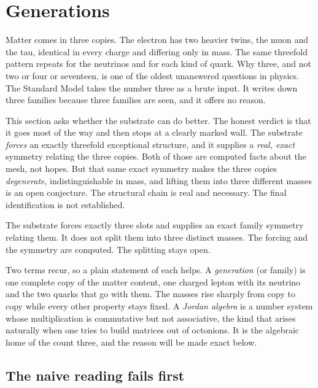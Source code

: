 \section{Generations}

Matter comes in three copies. The electron has two heavier twins, the muon and the tau, identical in every charge and differing only in mass. The same threefold pattern repeats for the neutrinos and for each kind of quark. Why three, and not two or four or seventeen, is one of the oldest unanswered questions in physics. The Standard Model takes the number three as a brute input. It writes down three families because three families are seen, and it offers no reason.

This section asks whether the substrate can do better. The honest verdict is that it goes most of the way and then stops at a clearly marked wall. The substrate \emph{forces} an exactly threefold exceptional structure, and it supplies a \emph{real, exact} symmetry relating the three copies. Both of those are computed facts about the mesh, not hopes. But that same exact symmetry makes the three copies \emph{degenerate}, indistinguishable in mass, and lifting them into three different masses is an open conjecture. The structural chain is real and necessary. The final identification is not established.

\begin{result}
The substrate forces exactly three slots and supplies an exact family symmetry relating them. It does not split them into three distinct masses. The forcing and the symmetry are computed. The splitting stays open.
\end{result}

Two terms recur, so a plain statement of each helps. A \emph{generation} (or family) is one complete copy of the matter content, one charged lepton with its neutrino and the two quarks that go with them. The masses rise sharply from copy to copy while every other property stays fixed. A \emph{Jordan algebra} is a number system whose multiplication is commutative but not associative, the kind that arises naturally when one tries to build matrices out of octonions. It is the algebraic home of the count three, and the reason will be made exact below.

\subsection{The naive reading fails first}

